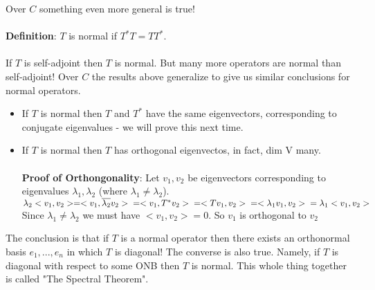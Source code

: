 \documentclass{article}
\begin{document}
Over $C$ something even more general is true! \\\\
\textbf{Definition}: $T$ is normal if $T^* T = TT^*$. \\\\
If $T$ is self-adjoint then $T$ is normal. But many more operators are normal than self-adjoint! Over $C$ the results above generalize to give us similar conclusions for normal operators. 
\begin{itemize}
    \item If $T$ is normal then $T$ and $T^*$ have the same eigenvectors, corresponding to conjugate eigenvalues - we will prove this next time. 
    \item If $T$ is normal then $T$ has orthogonal eigenvectos, in fact, dim V many. \\\\
    \textbf{Proof of Orthongonality}: Let $v_1, v_2$ be eigenvectors corresponding to eigenvalues $\lambda_1, \lambda_2$ (where $\lambda_1 \neq \lambda_2$). \\
    $\lambda_2 <v_1, v_2> = <v_1, \overline{\lambda_2}v_2>\\
    = <v_1, T^*v_2> \\
    = <Tv_1, v_2> \\
    = <\lambda_1 v_1, v_2>\\
    = \lambda_1 <v_1,v_2>$\\
    Since $\lambda_1 \neq \lambda_2$ we must have $<v_1, v_2> = 0$. So $v_1$ is orthogonal to $v_2$
\end{itemize}
The conclusion is that if $T$ is a normal operator then there exists an orthonormal basis $e_1, ..., e_n$ in which $T$ is diagonal! The converse is also true. Namely, if $T$ is diagonal with respect to some ONB then $T$ is normal. This whole thing together is called "The Spectral Theorem". 
\end{document}
